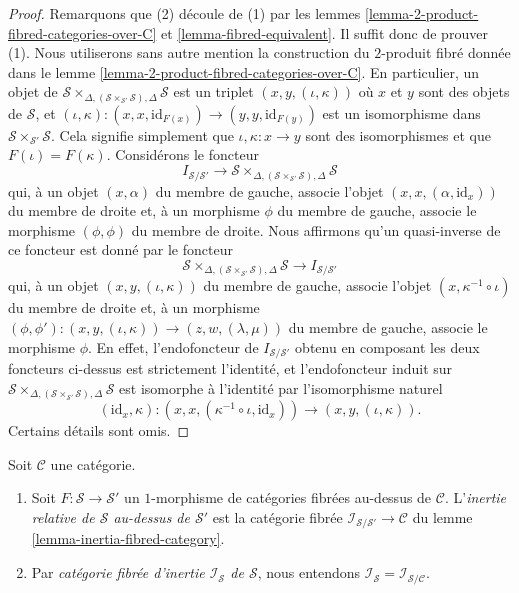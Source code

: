 \begin{proof}
Remarquons que (2) découle de (1) par les
lemmes \ref{lemma-2-product-fibred-categories-over-C} et
\ref{lemma-fibred-equivalent}. Il suffit donc de prouver (1).
Nous utiliserons sans autre mention la construction du $2$-produit fibré
donnée dans le
lemme \ref{lemma-2-product-fibred-categories-over-C}.
En particulier, un objet de
$\mathcal{S}
\times_{\Delta, (\mathcal{S} \times_{\mathcal{S}'} \mathcal{S}), \Delta}
\mathcal{S}$
est un triplet $(x, y, (\iota, \kappa))$ où $x$ et $y$ sont des objets de
$\mathcal{S}$, et
$(\iota, \kappa) : (x, x, \text{id}_{F(x)}) \to (y, y, \text{id}_{F(y)})$
est un isomorphisme dans $\mathcal{S} \times_{\mathcal{S}'} \mathcal{S}$.
Cela signifie simplement que $\iota, \kappa : x \to y$ sont des isomorphismes et que
$F(\iota) = F(\kappa)$. Considérons le foncteur
$$
I_{\mathcal{S}/\mathcal{S}'}
\longrightarrow
\mathcal{S}
\times_{\Delta, (\mathcal{S} \times_{\mathcal{S}'} \mathcal{S}), \Delta}
\mathcal{S}
$$
qui, à un objet $(x, \alpha)$ du membre de gauche, associe l'objet
$(x, x, (\alpha, \text{id}_x))$ du membre de droite
et, à un morphisme $\phi$ du membre de gauche,
associe le morphisme $(\phi, \phi)$ du membre de droite.
Nous affirmons qu'un quasi-inverse de ce foncteur est donné par le
foncteur
$$
\mathcal{S}
\times_{\Delta, (\mathcal{S} \times_{\mathcal{S}'} \mathcal{S}), \Delta}
\mathcal{S}
\longrightarrow
I_{\mathcal{S}/\mathcal{S}'}
$$
qui, à un objet $(x, y, (\iota, \kappa))$ du membre de gauche,
associe l'objet $(x, \kappa^{-1} \circ \iota)$ du membre de droite
et, à un morphisme
$(\phi, \phi') : (x, y, (\iota, \kappa)) \to (z, w, (\lambda, \mu))$
du membre de gauche, associe le morphisme $\phi$.
En effet, l'endofoncteur de $I_{\mathcal{S}/\mathcal{S}'}$ obtenu
en composant les deux foncteurs ci-dessus est strictement l'identité, et
l'endofoncteur induit sur
$\mathcal{S}
\times_{\Delta, (\mathcal{S} \times_{\mathcal{S}'} \mathcal{S}), \Delta}
\mathcal{S}$
est isomorphe à
l'identité par l'isomorphisme naturel
$$
(\text{id}_x, \kappa) :
(x, x, (\kappa^{-1} \circ \iota, \text{id}_x))
\longrightarrow
(x, y, (\iota, \kappa)).
$$
Certains détails sont omis.
\end{proof}

\begin{definition}
\label{definition-inertia-fibred-category}
Soit $\mathcal{C}$ une catégorie.
\begin{enumerate}
\item Soit $F : \mathcal{S} \to \mathcal{S}'$ un $1$-morphisme de
catégories fibrées au-dessus de $\mathcal{C}$. L'{\it inertie relative
de $\mathcal{S}$ au-dessus de $\mathcal{S}'$} est la catégorie fibrée
$\mathcal{I}_{\mathcal{S}/\mathcal{S}'} \to \mathcal{C}$ du
lemme \ref{lemma-inertia-fibred-category}.
\item Par {\it catégorie fibrée d'inertie $\mathcal{I}_\mathcal{S}$
de $\mathcal{S}$}, nous entendons
$\mathcal{I}_\mathcal{S} = \mathcal{I}_{\mathcal{S}/\mathcal{C}}$.
\end{enumerate}
\end{definition}

